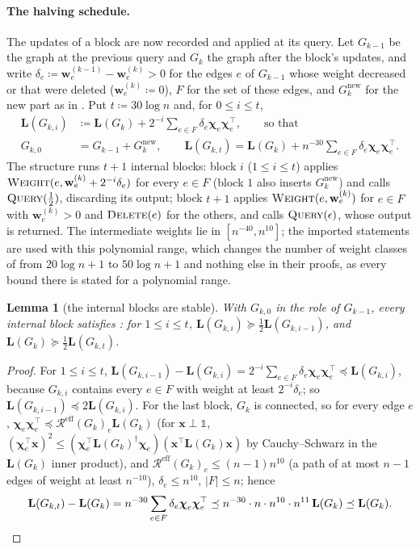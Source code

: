 \documentclass[11pt]{article}
\newtheorem{lemma}[theorem]{Lemma}
\theoremstyle{remark}
\newcommand{\cchi}{{\boldsymbol\chi}}
\newcommand{\LL}{\mathbf L}
\newcommand{\ww}{\mathbf w}
\newcommand{\xx}{\mathbf x}
\newcommand{\Gnew}{G^{\mathrm{new}}}
\newcommand{\Rcal}{\mathcal{R}}
\newcommand{\Reff}{\Rcal^{\mathrm{eff}}}
\newcommand{\defeq}{\coloneqq}
\newcommand{\oone}{\mathds{1}}
\begin{document}
\paragraph{The halving schedule.}
The updates of a block are now recorded and applied at its query.
Let $G_{k-1}$ be the graph at the previous query and $G_k$ the graph after
the block's updates, and write $\delta_e\defeq\ww^{(k-1)}_e-\ww^{(k)}_e>0$
for the edges $e$ of $G_{k-1}$ whose weight decreased or that were deleted
($\ww^{(k)}_e\defeq0$), $F$ for the set of these edges, and $\Gnew_k$ for the
new part as in .
Put $t\defeq30\log n$ and, for $0\le i\le t$,
\begin{align*}
\LL(G_{k,i})&\defeq\LL(G_k)+2^{-i}\sum_{e\in F}\delta_e\cchi_e\cchi_e^{\top},
\qquad\text{so that}\\
G_{k,0}&=G_{k-1}+\Gnew_k,\qquad
\LL(G_{k,t})=\LL(G_k)+n^{-30}\sum_{e\in F}\delta_e\cchi_e\cchi_e^{\top}.
\end{align*}
The structure runs $t+1$ internal blocks: block $i$ ($1\le i\le t$) applies
$\textsc{Weight}(e,\ww^{(k)}_e+2^{-i}\delta_e)$ for every $e\in F$ (block $1$
also inserts $\Gnew_k$) and calls $\textsc{Query}(\frac12)$, discarding its
output; block $t+1$ applies $\textsc{Weight}(e,\ww^{(k)}_e)$ for $e\in F$ with
$\ww^{(k)}_e>0$ and $\textsc{Delete}(e)$ for the others, and calls
$\textsc{Query}(\epsilon)$, whose output is returned.
The intermediate weights lie in $[n^{-40},n^{10}]$; the imported statements
are used with this polynomial range, which changes the number of weight
classes of  from $20\log n+1$ to $50\log n+1$ and nothing
else in their proofs, as every bound there is stated for a polynomial range.

\begin{lemma}[the internal blocks are stable]\label{lem:halving}
With $G_{k,0}$ in the role of $G_{k-1}$, every internal block satisfies
: for $1\le i\le t$, $\LL(G_{k,i})\succeq\frac12\LL(G_{k,i-1})$,
and $\LL(G_k)\succeq\frac12\LL(G_{k,t})$.
\end{lemma}
\begin{proof}
For $1\le i\le t$, $\LL(G_{k,i-1})-\LL(G_{k,i})=2^{-i}\sum_{e\in F}\delta_e\cchi_e\cchi_e^{\top}\preceq\LL(G_{k,i})$,
because $G_{k,i}$ contains every $e\in F$ with weight at least
$2^{-i}\delta_e$; so $\LL(G_{k,i-1})\preceq2\LL(G_{k,i})$.
For the last block, $G_k$ is connected, so for every edge $e$,
$\cchi_e\cchi_e^{\top}\preceq\Reff(G_k)_e\LL(G_k)$ (for $\xx\perp\oone$,
$(\cchi_e^{\top}\xx)^{2}\le(\cchi_e^{\top}\LL(G_k)^{\dag}\cchi_e)(\xx^{\top}\LL(G_k)\xx)$
by Cauchy--Schwarz in the $\LL(G_k)$ inner product), and
$\Reff(G_k)_e\le(n-1)n^{10}$ (a path of at most $n-1$ edges of weight at
least $n^{-10}$), $\delta_e\le n^{10}$, $|F|\le n$; hence
\[
\LL(G_{k,t})-\LL(G_k)=n^{-30}\sum_{e\in F}\delta_e\cchi_e\cchi_e^{\top}
\preceq n^{-30}\cdot n\cdot n^{10}\cdot n^{11}\,\LL(G_k)\preceq\LL(G_k).
\qedhere
\]
\end{proof}
\end{document}
